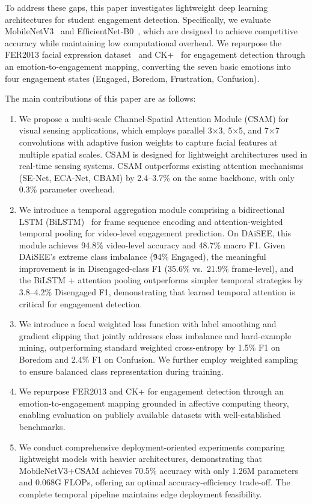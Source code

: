 \documentclass[sensors,article,submit,pdftex,moreauthors]{Definitions/mdpi}
\begin{document}
To address these gaps, this paper investigates lightweight deep learning architectures for student engagement detection. Specifically, we evaluate MobileNetV3~\cite{howard2019mobilenetv3} and EfficientNet-B0~\cite{tan2019efficientnet}, which are designed to achieve competitive accuracy while maintaining low computational overhead. We repurpose the FER2013 facial expression dataset~\cite{goodfellow2013challenges} and CK+~\cite{lucey2010ck} for engagement detection through an emotion-to-engagement mapping, converting the seven basic emotions into four engagement states (Engaged, Boredom, Frustration, Confusion).

The main contributions of this paper are as follows:
\begin{enumerate}
\item We propose a multi-scale Channel-Spatial Attention Module (CSAM) for visual sensing applications, which employs parallel 3$\times$3, 5$\times$5, and 7$\times$7 convolutions with adaptive fusion weights to capture facial features at multiple spatial scales. CSAM is designed for lightweight architectures used in real-time sensing systems. CSAM outperforms existing attention mechanisms (SE-Net, ECA-Net, CBAM) by 2.4--3.7\% on the same backbone, with only 0.3\% parameter overhead.
\item We introduce a temporal aggregation module comprising a bidirectional LSTM (BiLSTM)~\cite{hochreiter1997lstm,schuster1997bilstm} for frame sequence encoding and attention-weighted temporal pooling for video-level engagement prediction. On DAiSEE, this module achieves 94.8\% video-level accuracy and 48.7\% macro F1. Given DAiSEE's extreme class imbalance (\~94\% Engaged), the meaningful improvement is in Disengaged-class F1 (35.6\% vs.\ 21.9\% frame-level), and the BiLSTM + attention pooling outperforms simpler temporal strategies by 3.8--4.2\% Disengaged F1, demonstrating that learned temporal attention is critical for engagement detection.
\item We introduce a focal weighted loss function with label smoothing and gradient clipping that jointly addresses class imbalance and hard-example mining, outperforming standard weighted cross-entropy by 1.5\% F1 on Boredom and 2.4\% F1 on Confusion. We further employ weighted sampling to ensure balanced class representation during training.
\item We repurpose FER2013 and CK+ for engagement detection through an emotion-to-engagement mapping grounded in affective computing theory, enabling evaluation on publicly available datasets with well-established benchmarks.
\item We conduct comprehensive deployment-oriented experiments comparing lightweight models with heavier architectures, demonstrating that MobileNetV3+CSAM achieves 70.5\% accuracy with only 1.26M parameters and 0.068G FLOPs, offering an optimal accuracy-efficiency trade-off. The complete temporal pipeline maintains edge deployment feasibility.
\end{enumerate}
\end{document}
